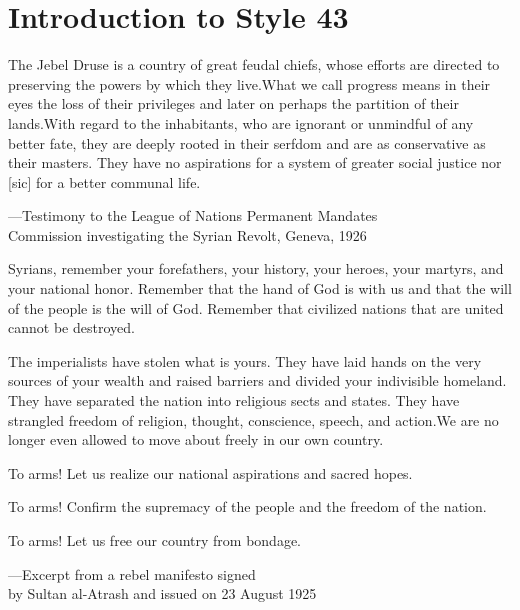 




\chapter{Introduction to Style 43}

\epigraph{The Jebel Druse is a country of great feudal chiefs, whose efforts are
directed to preserving the powers by which they live.What we call
progress means in their eyes the loss of their privileges and later on
perhaps the partition of their lands.With regard to the inhabitants,
who are ignorant or unmindful of any better fate, they are deeply rooted
in their serfdom and are as conservative as their masters. They have no
aspirations for a system of greater social justice nor [sic] for a better
communal life.}{---Testimony to the League of Nations Permanent Mandates\\
Commission investigating the Syrian Revolt, Geneva, 1926}

\epigraph{Syrians, remember your forefathers, your history, your heroes, your
martyrs, and your national honor. Remember that the hand of God is
with us and that the will of the people is the will of God. Remember
that civilized nations that are united cannot be destroyed.

The imperialists have stolen what is yours. They have laid hands on
the very sources of your wealth and raised barriers and divided your
indivisible homeland. They have separated the nation into religious
sects and states. They have strangled freedom of religion, thought,
conscience, speech, and action.We are no longer even allowed to move
about freely in our own country.

To arms! Let us realize our national aspirations and sacred hopes.

To arms! Confirm the supremacy of the people and the freedom of
the nation.

To arms! Let us free our country from bondage.}{---Excerpt from a rebel manifesto signed\\ by Sultan
al-Atrash and issued on 23 August 1925}

